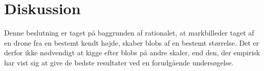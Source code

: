 \section{Diskussion}


Denne beslutning er taget på baggrunden af rationalet, at markbilleder taget af en drone fra en bestemt kendt højde, skaber blobs af en bestemt størrelse. Det er derfor ikke nødvendigt at kigge efter blobs på andre skaler, end den, der empirisk har vist sig at give de bedste resultater  ved en forudgående undersøgelse.